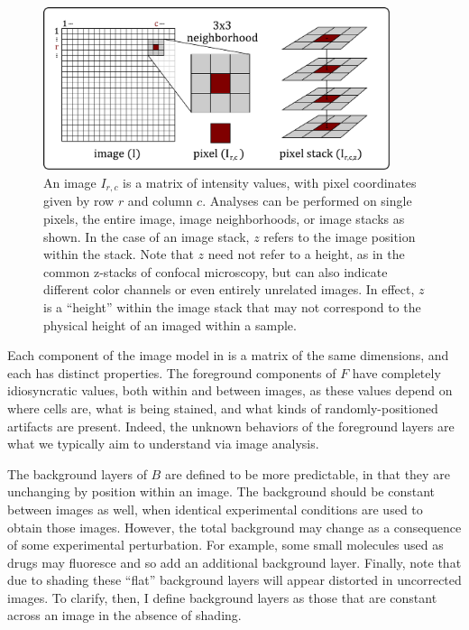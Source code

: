   \begin{figure}[!bt]
  \centering
  \includegraphics[width=4in]{FIGS/imaging/stack.pdf}
  {\singlespacing 
  \caption[ Pixel coordinate system.]
            { An image $I_{r,c}$ is a matrix of intensity values,
            with pixel coordinates
			given by row $r$ and column $c$. Analyses can
			be performed on single pixels, the entire image, image
			neighborhoods, or image stacks as shown. In the case of an image stack,
			$z$ refers to the image position within the stack. Note that $z$ need not
			refer to a height, as in the common z-stacks of confocal microscopy,
			but can also indicate different color
			channels or even entirely unrelated images. In effect, $z$
            is a ``height'' within the image stack that may not
            correspond to the physical height of an imaged within a sample.}
  \label{fig:imaging:stack}}
  \end{figure}


Each component of the image model in 
is a matrix of the same dimensions,
and each has distinct properties. The foreground components
of $F$ have completely idiosyncratic
values, both within and between images, as these
values depend on where cells are, what is
being stained, and what kinds of randomly-positioned
artifacts are present. Indeed, the
unknown behaviors of the foreground layers are 
what we typically aim to understand
via image analysis.


The background layers of $B$ are defined to
be more predictable, in that they are
unchanging by position within an image. The background should
be constant between images as well,
when identical experimental conditions
are used to obtain those images.
However, the total background
may change as a consequence of some experimental
perturbation. For example, some small
molecules used as drugs may fluoresce
and so add an additional background layer.
Finally, note that due to shading these
``flat'' background layers will appear
distorted in uncorrected images.
To clarify, then, I define background
layers as those that are constant across an image
in the absence of shading.


